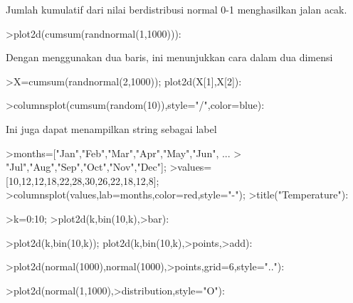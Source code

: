 \documentclass[a4paper,10pt]{article}
\begin{document}
\begin{eulernotebook}
\begin{eulercomment}
\begin{eulercomment}
\begin{eulercomment}
Jumlah kumulatif dari nilai berdistribusi normal 0-1 menghasilkan
jalan acak.
\end{eulercomment}
\begin{eulerprompt}
>plot2d(cumsum(randnormal(1,1000))):
\end{eulerprompt}
\begin{eulercomment}
Dengan menggunakan dua baris, ini menunjukkan cara dalam dua dimensi
\end{eulercomment}
\begin{eulerprompt}
>X=cumsum(randnormal(2,1000)); plot2d(X[1],X[2]):
\end{eulerprompt}
\begin{eulerprompt}
>columnsplot(cumsum(random(10)),style="/",color=blue):
\end{eulerprompt}
\begin{eulercomment}
Ini juga dapat menampilkan string sebagai label
\end{eulercomment}
\begin{eulerprompt}
>months=["Jan","Feb","Mar","Apr","May","Jun", ...
>  "Jul","Aug","Sep","Oct","Nov","Dec"];
>values=[10,12,12,18,22,28,30,26,22,18,12,8];
>columnsplot(values,lab=months,color=red,style="-");
>title("Temperature"):
\end{eulerprompt}
\begin{eulerprompt}
>k=0:10;
>plot2d(k,bin(10,k),>bar):
\end{eulerprompt}
\begin{eulerprompt}
>plot2d(k,bin(10,k)); plot2d(k,bin(10,k),>points,>add):
\end{eulerprompt}
\begin{eulerprompt}
>plot2d(normal(1000),normal(1000),>points,grid=6,style=".."):
\end{eulerprompt}
\begin{eulerprompt}
>plot2d(normal(1,1000),>distribution,style="O"):
\end{eulerprompt}

\end{eulercomment}
\end{eulercomment}
\end{eulernotebook}
\end{document}
